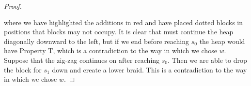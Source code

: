 \begin{theorem}
\begin{proof}
\begin{center}
	\end{center}
	where we have highlighted the additions in \textcolor{rred}{red} and have placed dotted blocks in positions that blocks may not occupy. It is clear that  must continue the heap diagonally downward to the left, but if we end before reaching $s_0$ the heap would have Property T, which is a contradiction to the way in which we chose $w$. Suppose that the zig-zag continues on after reaching $s_0$. Then we are able to drop the block for $s_1$ down and create a lower braid. This is a contradiction to the way in which we chose $w$.
	

\end{proof}
\end{theorem}
